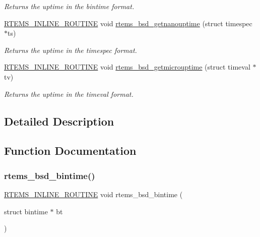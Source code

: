 \begin{DoxyCompactItemize}
\begin{DoxyCompactList}\small\item\em Returns the uptime in the bintime format. \end{DoxyCompactList}\item 
\mbox{\hyperlink{group__RTEMSScoreBaseDefs_gac216239df231d5dbd15e3520b0b9313f}{R\+T\+E\+M\+S\+\_\+\+I\+N\+L\+I\+N\+E\+\_\+\+R\+O\+U\+T\+I\+NE}} void \mbox{\hyperlink{group__RTEMSAPIBSD_ga9f9b8c3ad96826d5e89540d05c5bafb5}{rtems\+\_\+bsd\+\_\+getnanouptime}} (struct timespec $\ast$ts)
\begin{DoxyCompactList}\small\item\em Returns the uptime in the timespec format. \end{DoxyCompactList}\item 
\mbox{\hyperlink{group__RTEMSScoreBaseDefs_gac216239df231d5dbd15e3520b0b9313f}{R\+T\+E\+M\+S\+\_\+\+I\+N\+L\+I\+N\+E\+\_\+\+R\+O\+U\+T\+I\+NE}} void \mbox{\hyperlink{group__RTEMSAPIBSD_gada6a5ad1b2e7ba292b58a83e7029bf77}{rtems\+\_\+bsd\+\_\+getmicrouptime}} (struct timeval $\ast$tv)
\begin{DoxyCompactList}\small\item\em Returns the uptime in the timeval format. \end{DoxyCompactList}\end{DoxyCompactItemize}


\subsection{Detailed Description}


\subsection{Function Documentation}
\mbox{\label{group__RTEMSAPIBSD_ga7474fb42d7220f6a3f77a49bebeb58c1}} 
\subsubsection{\texorpdfstring{rtems\_bsd\_bintime()}{rtems\_bsd\_bintime()}}
{\footnotesize\ttfamily \mbox{\hyperlink{group__RTEMSScoreBaseDefs_gac216239df231d5dbd15e3520b0b9313f}{R\+T\+E\+M\+S\+\_\+\+I\+N\+L\+I\+N\+E\+\_\+\+R\+O\+U\+T\+I\+NE}} void rtems\+\_\+bsd\+\_\+bintime (\begin{DoxyParamCaption}\item[{struct bintime $\ast$}]{bt }\end{DoxyParamCaption})}



